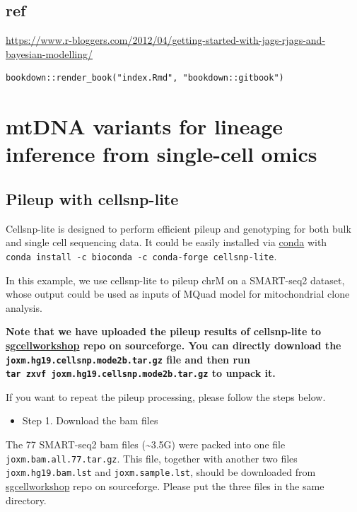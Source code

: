 \documentclass[
]{book}
\providecommand{\tightlist}{%
  \setlength{\itemsep}{0pt}\setlength{\parskip}{0pt}}
\begin{document}
\hypertarget{ref}{%
\section{ref}\label{ref}}

\url{https://www.r-bloggers.com/2012/04/getting-started-with-jags-rjags-and-bayesian-modelling/}

\begin{verbatim}
bookdown::render_book("index.Rmd", "bookdown::gitbook")
\end{verbatim}

\hypertarget{mtdna-variants-for-lineage-inference-from-single-cell-omics}{%
\chapter{mtDNA variants for lineage inference from single-cell omics}\label{mtdna-variants-for-lineage-inference-from-single-cell-omics}}

\hypertarget{pileup-with-cellsnp-lite}{%
\section{Pileup with cellsnp-lite}\label{pileup-with-cellsnp-lite}}

Cellsnp-lite is designed to perform efficient pileup and genotyping for both bulk and single cell sequencing data. It could be easily installed via \protect\hyperlink{conda_install}{conda} with \texttt{conda\ install\ -c\ bioconda\ -c\ conda-forge\ cellsnp-lite}.

In this example, we use cellsnp-lite to pileup chrM on a SMART-seq2 dataset, whose output could be used as inputs of MQuad model for mitochondrial clone analysis.

\textbf{Note that we have uploaded the pileup results of cellsnp-lite to \href{https://sourceforge.net/projects/sgcellworkshop/files/mtDNA_analysis/}{sgcellworkshop} repo on sourceforge. You can directly download the \texttt{joxm.hg19.cellsnp.mode2b.tar.gz} file and then run \texttt{tar\ zxvf\ joxm.hg19.cellsnp.mode2b.tar.gz} to unpack it.}

If you want to repeat the pileup processing, please follow the steps below.

\begin{itemize}
\tightlist
\item
  Step 1. Download the bam files
\end{itemize}

The 77 SMART-seq2 bam files (\textasciitilde3.5G) were packed into one file \texttt{joxm.bam.all.77.tar.gz}. This file, together with another two files \texttt{joxm.hg19.bam.lst} and \texttt{joxm.sample.lst}, should be downloaded from \href{https://sourceforge.net/projects/sgcellworkshop/files/mtDNA_analysis/}{sgcellworkshop} repo on sourceforge. Please put the three files in the same directory.
\end{document}
